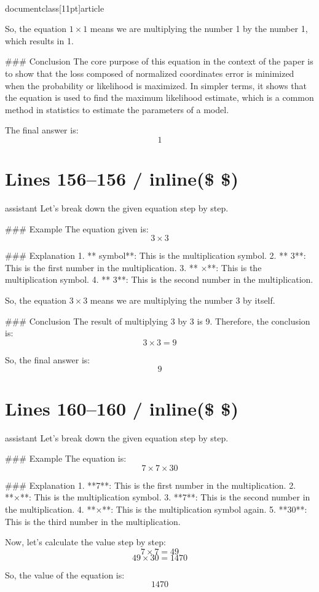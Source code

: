 \\documentclass[11pt]{article}
\begin{document}
So, the equation \(1 \times 1\) means we are multiplying the number 1 by the number 1, which results in 1.

### Conclusion
The core purpose of this equation in the context of the paper is to show that the loss composed of normalized coordinates error is minimized when the probability or likelihood is maximized. In simpler terms, it shows that the equation is used to find the maximum likelihood estimate, which is a common method in statistics to estimate the parameters of a model.

The final answer is:
\[
\boxed{1}
\]


\section*{Lines 156–156 / inline(\$ \$) }
assistant
Let's break down the given equation step by step.

### Example
The equation given is:
\[ 3 \times 3 \]

### Explanation
1. ** symbol**: This is the multiplication symbol.
2. ** 3**: This is the first number in the multiplication.
3. ** ×**: This is the multiplication symbol.
4. ** 3**: This is the second number in the multiplication.

So, the equation \( 3 \times 3 \) means we are multiplying the number 3 by itself.

### Conclusion
The result of multiplying 3 by 3 is 9. Therefore, the conclusion is:
\[ 3 \times 3 = 9 \]

So, the final answer is:
\[
\boxed{9}
\]


\section*{Lines 160–160 / inline(\$ \$) }
assistant
Let's break down the given equation step by step.

### Example
The equation is:
\[ 7 \times 7 \times 30 \]

### Explanation
1. **7**: This is the first number in the multiplication.
2. **×**: This is the multiplication symbol.
3. **7**: This is the second number in the multiplication.
4. **×**: This is the multiplication symbol again.
5. **30**: This is the third number in the multiplication.

Now, let's calculate the value step by step:
\[ 7 \times 7 = 49 \]
\[ 49 \times 30 = 1470 \]

So, the value of the equation is:
\[ 1470 \]
\end{document}
